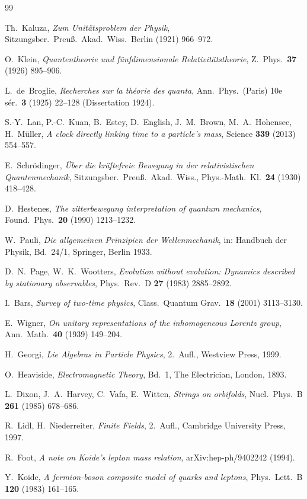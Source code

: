\begin{thebibliography}{99}

Th.~Kaluza, \textit{Zum Unitätsproblem der Physik},
Sitzungsber.\ Preuß.\ Akad.\ Wiss.\ Berlin (1921) 966--972.

O.~Klein, \textit{Quantentheorie und fünfdimensionale Relativitätstheorie},
Z.\ Phys.\ \textbf{37} (1926) 895--906.

L.~de~Broglie, \textit{Recherches sur la théorie des quanta},
Ann.\ Phys.\ (Paris) 10e sér.\ \textbf{3} (1925) 22--128 (Dissertation 1924).

S.-Y.~Lan, P.-C.~Kuan, B.~Estey, D.~English, J.~M.~Brown, M.~A.~Hohensee, H.~Müller,
\textit{A clock directly linking time to a particle's mass},
Science \textbf{339} (2013) 554--557.

E.~Schrödinger, \textit{Über die kräftefreie Bewegung in der relativistischen Quantenmechanik},
Sitzungsber.\ Preuß.\ Akad.\ Wiss., Phys.-Math.\ Kl.\ \textbf{24} (1930) 418--428.

D.~Hestenes, \textit{The zitterbewegung interpretation of quantum mechanics},
Found.\ Phys.\ \textbf{20} (1990) 1213--1232.

W.~Pauli, \textit{Die allgemeinen Prinzipien der Wellenmechanik},
in: Handbuch der Physik, Bd.~24/1, Springer, Berlin 1933.

D.~N.~Page, W.~K.~Wootters, \textit{Evolution without evolution: Dynamics described by stationary
observables}, Phys.\ Rev.\ D \textbf{27} (1983) 2885--2892.

I.~Bars, \textit{Survey of two-time physics},
Class.\ Quantum Grav.\ \textbf{18} (2001) 3113--3130.

E.~Wigner, \textit{On unitary representations of the inhomogeneous Lorentz group},
Ann.\ Math.\ \textbf{40} (1939) 149--204.

H.~Georgi, \textit{Lie Algebras in Particle Physics}, 2.~Aufl., Westview Press, 1999.

O.~Heaviside, \textit{Electromagnetic Theory}, Bd.~1, The Electrician, London, 1893.

L.~Dixon, J.~A.~Harvey, C.~Vafa, E.~Witten, \textit{Strings on orbifolds},
Nucl.\ Phys.\ B \textbf{261} (1985) 678--686.

R.~Lidl, H.~Niederreiter, \textit{Finite Fields}, 2.~Aufl., Cambridge University Press, 1997.

R.~Foot, \textit{A note on Koide's lepton mass relation}, arXiv:hep-ph/9402242 (1994).

Y.~Koide, \textit{A fermion-boson composite model of quarks and leptons},
Phys.\ Lett.\ B \textbf{120} (1983) 161--165.

\end{thebibliography}
